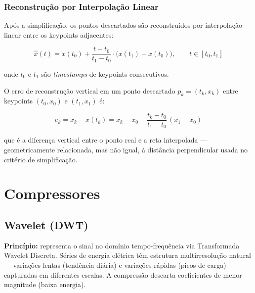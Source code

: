 \documentclass[12pt, a4paper]{article}
\begin{document}
\subsubsection{Reconstrução por Interpolação Linear}

Após a simplificação, os pontos descartados são reconstruídos por interpolação linear entre os keypoints adjacentes:

\begin{equation}
    \hat{x}(t) = x(t_0) + \frac{t - t_0}{t_1 - t_0} \cdot \bigl(x(t_1) - x(t_0)\bigr),
    \qquad t \in [t_0, t_1]
\end{equation}

onde $t_0$ e $t_1$ são \textit{timestamps} de keypoints consecutivos.

O erro de reconstrução vertical em um ponto descartado $p_k = (t_k, x_k)$ entre keypoints $(t_0, x_0)$ e $(t_1, x_1)$ é:

\begin{equation}
    e_k = x_k - \hat{x}(t_k) = x_k - x_0 - \frac{t_k - t_0}{t_1 - t_0}\,(x_1 - x_0)
\end{equation}

que é a diferença vertical entre o ponto real e a reta interpolada — geometricamente relacionada, mas não igual, à distância perpendicular usada no critério de simplificação.

\section{Compressores}

\subsection{Wavelet (DWT)}

\textbf{Princípio:} representa o sinal no domínio tempo-frequência via Transformada Wavelet Discreta. Séries de energia elétrica têm estrutura multirresolução natural — variações lentas (tendência diária) e variações rápidas (picos de carga) — capturadas em diferentes escalas. A compressão descarta coeficientes de menor magnitude (baixa energia).
\end{document}
